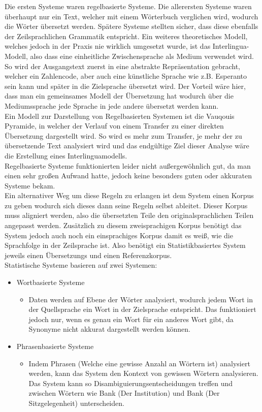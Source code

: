 \documentclass{article}
\begin{document}
	Die ersten Systeme waren regelbasierte Systeme. Die allerersten Systeme waren überhaupt nur ein Text, welcher mit einem Wörterbuch verglichen wird, wodurch die Wörter übersetzt werden. Spätere Systeme stellten sicher, dass diese ebenfalls der Zeilsprachlichen Grammatik entspricht. Ein weiteres theoretisches Modell, welches jedoch in der Praxis nie wirklich umgesetzt wurde, ist das Interlingua-Modell, also dass eine einheitliche Zwischensprache als Medium verwendet wird. So wird der Ausgangstext zuerst in eine abstrakte Repräsentation gebracht, welcher ein Zahlencode, aber auch eine künstliche Sprache wie z.B. Esperanto sein kann und später in die Zielsprache übersetzt wird. Der Vorteil wäre hier, dass man ein gemeinsames Modell der Übersetzung hat wodurch über die Mediumssprache jede Sprache in jede andere übersetzt werden kann. \\
	Ein Modell zur Darstellung von Regelbasierten Systemen ist die Vauqouis Pyramide, in welcher der Verlauf von einem Transfer zu einer direkten Übersetzung dargestellt wird. So wird es mehr zum Transfer, je mehr der zu übersetzende Text analysiert wird und das endgültige Ziel dieser Analyse wäre die Erstellung eines Interlinguamodells. \\
	Regelbasierte Systeme funktionierten leider nicht außergewöhnlich gut, da man einen sehr großen Aufwand hatte, jedoch keine besonders guten oder akkuraten Systeme bekam. \\
	Ein alternativer Weg um diese Regeln zu erlangen ist dem System einen Korpus zu geben wodurch sich dieses dann seine Regeln selbst ableitet. Dieser Korpus muss aligniert werden, also die übersetzten Teile den originalsprachlichen Teilen angepasst werden. Zusätzlich zu diesem zweisprachigen Korpus benötigt das System jedoch auch noch ein einsprachiges Korpus damit es weiß, wie die Sprachfolge in der Zeilsprache ist. Also benötigt ein Statistikbasiertes System jeweils einen Übersetzungs und einen Referenzkorpus. \\
	Statistische Systeme basieren auf zwei Systemen: \\
	\begin{itemize}
		\item{Wortbasierte Systeme}
		\begin{itemize}
			\item{Daten werden auf Ebene der Wörter analysiert, wodurch jedem Wort in der Quellsprache ein Wort in der Zielsprache entspricht. Das funktioniert jedoch nur, wenn es genau ein Wort für ein anderes Wort gibt, da Synonyme nicht akkurat dargestellt werden können.}
		\end{itemize}
		\item{Phrasenbasierte Systeme}
		\begin{itemize}
			\item{Indem Phrasen (Welche eine gewisse Anzahl an Wörtern ist) analysiert werden, kann das System den Kontext von gewissen Wörtern analysieren. Das System kann so Disambiguierungsentscheidungen treffen und zwischen Wörtern wie Bank (Der Institution) und Bank (Der Sitzgelegenheit) unterscheiden.}
		\end{itemize}
	\end{itemize}
\end{document}
